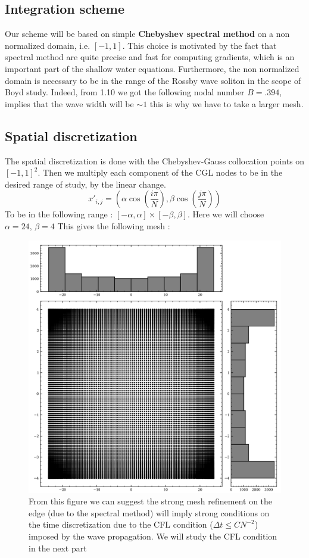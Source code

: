 \documentclass[11pt,a4paper]{report}
\begin{document}
\begin{multicols}{2}
    \section{Integration scheme}
    Our scheme will be based on simple \textbf{Chebyshev spectral method} on a non normalized domain, i.e. $[-1,1]$. This choice is motivated by the fact that spectral method are quite precise and fast for computing gradients, which is an important part of the shallow water equations.
    Furthermore, the non normalized domain is necessary to be in the range of the Rossby wave soliton in the scope of Boyd study. Indeed, from 1.10 we got the following nodal number $B = .394$, implies that the wave width will be $\sim 1$ this is why we have to take a larger mesh.
    \subsection{Spatial discretization}
    The spatial discretization is done with the Chebyshev-Gauss collocation points on $[-1,1]^2$. Then we multiply each component of the CGL nodes to be in the desired range of study, by the linear change.
    $$x'_{i,j} = (\alpha \cos(\frac{i\pi}{N}), \beta \cos(\frac{j\pi}{N}))$$
    To be in the following range : $[-\alpha, \alpha] \times [-\beta, \beta]$. Here we will choose $\alpha = 24, \, \beta = 4$
    This gives the following mesh :
    \begin{figure}[H]
        \hspace*{-.5cm}\includegraphics[width=1.1\linewidth]{./figure/mesh.png}
        \caption{From this figure we can suggest the strong mesh refinement on the edge (due to the spectral method) will imply strong conditions on the time discretization due to the CFL condition ($\Delta t \le C N^{-2}$) imposed by the wave propagation. We will study the
            CFL condition in the next part}
        \label{fig: mesh}
    \end{figure}


\end{multicols}
\end{document}
